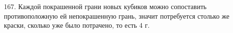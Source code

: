 167. Каждой покрашенной грани новых кубиков можно сопоставить противоположную ей непокрашенную грань, значит потребуется столько же краски, сколько уже было потрачено, то есть 4 г.\\
